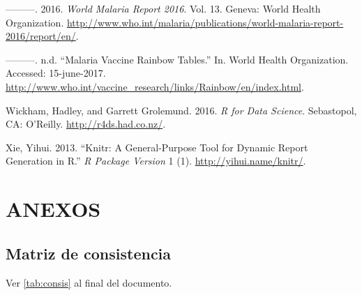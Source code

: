 \documentclass[
  a4paper]{article}
\begin{document}
\leavevmode\hypertarget{ref-WHO2016world}{}%
---------. 2016. \emph{World Malaria Report 2016}. Vol. 13. Geneva:
World Health Organization.
\url{http://www.who.int/malaria/publications/world-malaria-report-2016/report/en/}.

\leavevmode\hypertarget{ref-rainbow2016}{}%
---------. n.d. ``Malaria Vaccine Rainbow Tables.'' In. World Health
Organization. Accessed: 15-june-2017.
\url{http://www.who.int/vaccine_research/links/Rainbow/en/index.html}.

\leavevmode\hypertarget{ref-wickham2016r4ds}{}%
Wickham, Hadley, and Garrett Grolemund. 2016. \emph{R for Data Science}.
Sebastopol, CA: O'Reilly. \url{http://r4ds.had.co.nz/}.

\leavevmode\hypertarget{ref-knitr}{}%
Xie, Yihui. 2013. ``Knitr: A General-Purpose Tool for Dynamic Report
Generation in R.'' \emph{R Package Version} 1 (1).
\url{http://yihui.name/knitr/}.

\section{ANEXOS}\label{anexos}

\subsection{Matriz de consistencia}\label{matriz-de-consistencia}

Ver \autoref{tab:consis} al final del documento.
\end{document}
